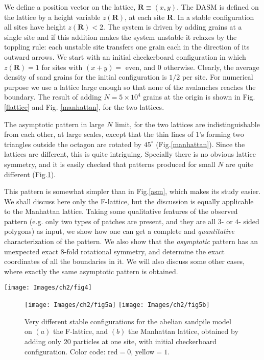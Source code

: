 \documentclass[11pt,a4paper]{book}
\begin{document}
We define a position vector on the lattice, $\mathbf{R}\equiv\left( x, y \right)$.
The DASM is defined on the lattice by a height variable
$z\left( \mathbf{R} \right)$, at each site $\mathbf{R}$.
In a stable configuration all sites have height $z\left( \mathbf{R} \right)<2$.
The system is driven by adding grains at a single site and if this addition
makes the system unstable it relaxes by the toppling rule: each unstable 
site transfers one grain each in the direction of its outward arrows. 
We start with an initial checkerboard configuration in which  $z\left( \mathbf{R} \right)=1$
for sites with $(x+y)=$ even, and $0$ otherwise. Clearly, the average density of
sand grains for the initial configuration is $1/2$ per site.
For numerical purpose we use a lattice large enough so that
none of the avalanches reaches the boundary.
The result of adding $N=5\times 10^4$ grains at the origin is shown in
Fig. \ref{flattice} and Fig. \ref{manhattan}, for the two lattices.

The asymptotic pattern in large $N$ limit, for the two lattices
are indistinguishable from each other, at large scales, except that the thin
lines of $1$'s forming two triangles outside the octagon are rotated by 
$45^{\circ}$ (Fig.\ref{manhattan}).  Since the lattices are different, 
this is quite intriguing. Specially there is no obvious lattice symmetry, and
it is easily checked that patterns produced for small $N$ are quite different 
(Fig.\ref{small}).


This pattern is somewhat simpler than in Fig.\ref{asm}, which makes its study easier. We shall discuss here only the F-lattice,
but the discussion is equally applicable to the Manhattan lattice. Taking some qualitative features 
of the observed pattern
(e.g. only
two types of patches are present, and they are all $3$- or $4$- sided 
polygons) as input, we show how one can get a complete and {\it 
quantitative} characterization of the pattern.  We also  show that the 
\textit{asymptotic} pattern 
has an unexpected  exact $8$-fold rotational symmetry, and determine the 
exact 
coordinates of all the boundaries in it.  We will also discuss 
some other cases, where exactly the same asymptotic pattern is obtained.


\begin{SCfigure}
 \texttt{[image: Images/ch2/fig4]}
 \caption{A stable configuration for the DASM on the 
Manhattan lattice of Fig.\ref{lattice}b, obtained by adding $25\times10^3$ 
particles at one site, with initial checkerboard configuration. Color code: red=0, yellow=1.
  (Details can be seen in the electronic version using zoom in.)}
 \label{manhattan} 
\end{SCfigure}
\begin{figure}
 \texttt{[image: Images/ch2/fig5a]}
 \texttt{[image: Images/ch2/fig5b]}
 \caption{Very different stable configurations for the abelian sandpile model on
$(a)$ the F-lattice, and $(b)$ the Manhattan lattice, 
obtained by adding only $20$ particles at one site, with initial 
checkerboard configuration. Color code: red$=0$, yellow$=1$.}
 \label{small}
\end{figure}
\end{document}
